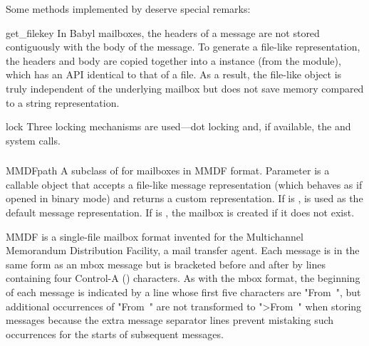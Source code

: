 Some  methods implemented by  deserve special
remarks:

\begin{methoddesc}{get_file}{key}
In Babyl mailboxes, the headers of a message are not stored contiguously with
the body of the message. To generate a file-like representation, the headers
and body are copied together into a  instance (from the
 module), which has an API identical to that of a file. As a
result, the file-like object is truly independent of the underlying mailbox but
does not save memory compared to a string representation.
\end{methoddesc}

\begin{methoddesc}{lock}{}
Three locking mechanisms are used---dot locking and, if available, the
 and  system calls.
\end{methoddesc}

\begin{seealso}
\end{seealso}

\subsubsection{}
\label{mailbox-mmdf}

\begin{classdesc}{MMDF}{path}
A subclass of  for mailboxes in MMDF format. Parameter
 is a callable object that accepts a file-like message
representation (which behaves as if opened in binary mode) and returns a custom
representation. If  is ,  is used as
the default message representation. If  is , the mailbox
is created if it does not exist.
\end{classdesc}

MMDF is a single-file mailbox format invented for the Multichannel Memorandum
Distribution Facility, a mail transfer agent. Each message is in the same form
as an mbox message but is bracketed before and after by lines containing four
Control-A () characters. As with the mbox format,
the beginning of each message is indicated by a line whose first five
characters are "From~", but additional occurrences of "From~" are not
transformed to ">From~" when storing messages because the extra message
separator lines prevent mistaking such occurrences for the starts of subsequent
messages.

